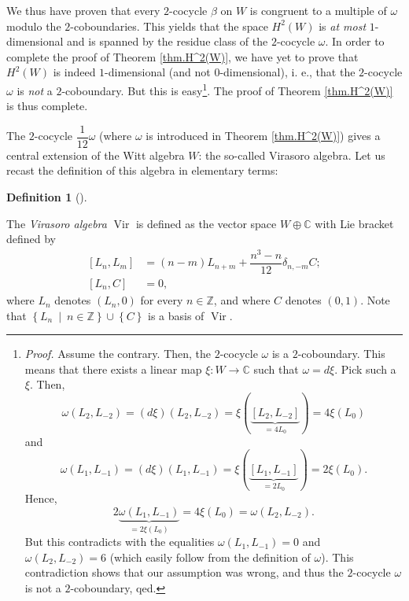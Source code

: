 \documentclass
[numbers=enddot,12pt,final,onecolumn,german,notitlepage]{scrartcl}%
\theoremstyle{definition}
\newtheorem{defi}[theo]{Definition}
\newenvironment{definition}[1][]
{\begin{defi}[#1]\begin{leftbar}}
{\end{leftbar}\end{defi}}
\begin{document}
We thus have proven that every $2$-cocycle $\beta$ on $W$ is congruent to a
multiple of $\omega$ modulo the $2$-coboundaries. This yields that the space
$H^{2}\left(  W\right)  $ is \textit{at most }$1$-dimensional and is spanned
by the residue class of the $2$-cocycle $\omega$. In order to complete the
proof of Theorem \ref{thm.H^2(W)}, we have yet to prove that $H^{2}\left(
W\right)  $ is indeed $1$-dimensional (and not $0$-dimensional), i. e., that
the $2$-cocycle $\omega$ is \textit{not} a $2$-coboundary. But this is
easy\footnote{\textit{Proof.} Assume the contrary. Then, the $2$-cocycle
$\omega$ is a $2$-coboundary. This means that there exists a linear map
$\xi:W\rightarrow\mathbb{C}$ such that $\omega=d\xi$. Pick such a $\xi$. Then,%
\[
\omega\left(  L_{2},L_{-2}\right)  =\left(  d\xi\right)  \left(  L_{2}%
,L_{-2}\right)  =\xi\left(  \underbrace{\left[  L_{2},L_{-2}\right]
}_{=4L_{0}}\right)  =4\xi\left(  L_{0}\right)
\]
and%
\[
\omega\left(  L_{1},L_{-1}\right)  =\left(  d\xi\right)  \left(  L_{1}%
,L_{-1}\right)  =\xi\left(  \underbrace{\left[  L_{1},L_{-1}\right]
}_{=2L_{0}}\right)  =2\xi\left(  L_{0}\right)  .
\]
Hence,%
\[
2\underbrace{\omega\left(  L_{1},L_{-1}\right)  }_{=2\xi\left(  L_{0}\right)
}=4\xi\left(  L_{0}\right)  =\omega\left(  L_{2},L_{-2}\right)  .
\]
But this contradicts with the equalities $\omega\left(  L_{1},L_{-1}\right)
=0$ and $\omega\left(  L_{2},L_{-2}\right)  =6$ (which easily follow from the
definition of $\omega$). This contradiction shows that our assumption was
wrong, and thus the $2$-cocycle $\omega$ is not a $2$-coboundary, qed.}. The
proof of Theorem \ref{thm.H^2(W)} is thus complete.

The $2$-cocycle $\dfrac{1}{12}\omega$ (where $\omega$ is introduced in Theorem
\ref{thm.H^2(W)}) gives a central extension of the Witt algebra $W$: the
so-called Virasoro algebra. Let us recast the definition of this algebra in
elementary terms:

\begin{definition}
The \textit{Virasoro algebra} $\operatorname*{Vir}$ is defined as the vector
space $W\oplus\mathbb{C}$ with Lie bracket defined by%
\begin{align*}
\left[  L_{n},L_{m}\right]   &  =\left(  n-m\right)  L_{n+m}+\dfrac{n^{3}%
-n}{12}\delta_{n,-m}C;\\
\left[  L_{n},C\right]   &  =0,
\end{align*}
where $L_{n}$ denotes $\left(  L_{n},0\right)  $ for every $n\in\mathbb{Z}$,
and where $C$ denotes $\left(  0,1\right)  $. Note that $\left\{  L_{n}%
\ \mid\ n\in\mathbb{Z}\right\}  \cup\left\{  C\right\}  $ is a basis of
$\operatorname*{Vir}$.
\end{definition}
\end{document}
